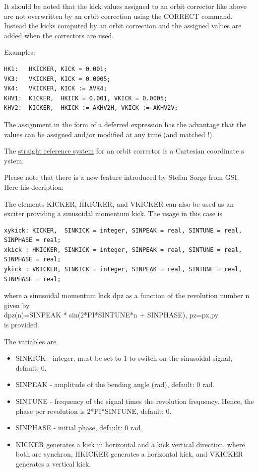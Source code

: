 It should be noted that the kick values assigned to an orbit corrector
like above are not overwritten by an orbit correction using the CORRECT
command. Instead the kicks computed by an orbit correction and the
assigned values are added when the correctors are used.  

 Examples: 
\begin{verbatim}
HK1:   HKICKER, KICK = 0.001;
VK3:   VKICKER, KICK = 0.0005;
VK4:   VKICKER, KICK := AVK4;
KHV1:  KICKER,  HKICK = 0.001, VKICK = 0.0005;
KHV2:  KICKER,  HKICK := AKHV2H, VKICK := AKHV2V;
\end{verbatim} 

The assignment in the form of a deferred expression has the advantage
that the values can be assigned and/or modified at any time (and matched
!).  

The \href{local_system.html#straight}{straight reference system} for an
orbit corrector is a Cartesian coordinate s ystem.  

Please note that there is a new feature introduced by Stefan Sorge from
GSI. Here his decription:

The elements KICKER, HKICKER, and VKICKER can also be used as  an
exciter providing a sinusoidal momentum kick. The usage in this case is   

\begin{verbatim}
xykick: KICKER,  SINKICK = integer, SINPEAK = real, SINTUNE = real, SINPHASE = real;  
xkick : HKICKER, SINKICK = integer, SINPEAK = real, SINTUNE = real, SINPHASE = real;  
ykick : VKICKER, SINKICK = integer, SINPEAK = real, SINTUNE = real, SINPHASE = real;  
\end{verbatim}
where a sinusoidal momentum kick dpz as a function of the  revolution
number n given by\\   
dpz(n)=SINPEAK * sin(2*PI*SINTUNE*n + SINPHASE), pz=px,py \\ 
is provided. 

The variables are 

\begin{itemize}
   \item SINKICK - integer, must be set to 1 to switch on the sinusoidal
     signal, default: 0.  
   \item SINPEAK - amplitude of the bending angle (rad), default: 0 rad.  
   \item SINTUNE - frequency of the signal times the revolution
     frequency.  Hence, the phase per revolution is 2*PI*SINTUNE,
     default: 0.   
   \item SINPHASE - initial phase, default: 0 rad.  
   \item KICKER generates a kick in horizontal and a kick vertical
     direction,  where both are synchron, HKICKER generates a horizontal
     kick,  and VKICKER generates a vertical kick.   
\end{itemize}

